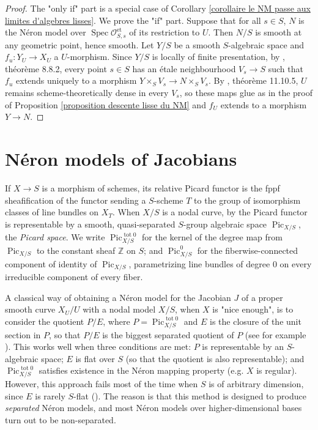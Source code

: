 \documentclass[a4paper,12pt]{amsart} %
\numberwithin{equation}{subsection}
\newcommand{\on}[1]{\operatorname{#1}}
\def\ZZ{\mathbb Z}
\newcommand{\Spec}{\operatorname{Spec}}
\theoremstyle{definition}
\theoremstyle{plain}%
\theoremstyle{remark}
\renewcommand{\O}{\mathcal{O}}
\begin{document}
\begin{proof}
The "only if" part is a special case of Corollary \ref{corollaire le NM passe aux limites d'algebres lisses}. We prove the "if" part. Suppose that for all $s\in S$, $N$ is the N\'eron model over $\Spec\O_{S,s}^{\on{et}}$ of its restriction to $U$. Then $N/S$ is smooth at any geometric point, hence smooth. Let $Y/S$ be a smooth $S$-algebraic space and $f_u\colon Y_U\to X_U$ a $U$-morphism. Since $Y/S$ is locally of finite presentation, by \cite{EGA4.3}, théorème 8.8.2, every point $s\in S$ has an \'etale neighbourhood $V_s\to S$ such that $f_u$ extends uniquely to a morphism $Y\times_S V_s\to N\times_S V_s$. By \cite{EGA4.3}, théorème 11.10.5, $U$ remains scheme-theoretically dense in every $V_s$, so these maps glue as in the proof of Proposition \ref{proposition descente lisse du NM} and $f_U$ extends to a morphism $Y\to N$.
\end{proof}





\section{N\'eron models of Jacobians}\label{sec6}

If $X\to S$ is a morphism of schemes, its relative Picard functor is the fppf sheafification of the functor sending a $S$-scheme $T$ to the group of isomorphism classes of line bundles on $X_T$. When $X/S$ is a nodal curve, by \cite[Theorem 8.3.1; Theorem 9.4.1]{NeronModels} the Picard functor is representable by a smooth, quasi-separated $S$-group algebraic space $\operatorname{Pic}_{X/S}$, the \emph{Picard space}. We write $\operatorname{Pic}^{\on{tot}0}_{X/S}$ for the kernel of the degree map from $\operatorname{Pic}_{X/S}$ to the constant sheaf $\ZZ$ on $S$; and $\operatorname{Pic}^{0}_{X/S}$ for the fiberwise-connected component of identity of $\operatorname{Pic}_{X/S}$, parametrizing line bundles of degree $0$ on every irreducible component of every fiber.

A classical way of obtaining a N\'eron model for the Jacobian $J$ of a proper smooth curve $X_U/U$ with a nodal model $X/S$, when $X$ is "nice enough", is to consider the quotient $P/E$, where $P=\operatorname{Pic}^{\on{tot}0}_{X/S}$ and $E$ is the closure of the unit section in $P$, so that $P/E$ is the biggest separated quotient of $P$ (see for example \cite[9.5]{NeronModels}). This works well when three conditions are met: $P$ is representable by an $S$-algebraic space; $E$ is flat over $S$ (so that the quotient is also representable); and $\operatorname{Pic}^{\on{tot}0}_{X/S}$ satisfies existence in the N\'eron mapping property (e.g. $X$ is regular). However, this approach fails most of the time when $S$ is of arbitrary dimension, since $E$ is rarely $S$-flat (\cite[Theorem 5.16]{Holmes}). The reason is that this method is designed to produce \emph{separated} Néron models, and most Néron models over higher-dimensional bases turn out to be non-separated.
\end{document}
